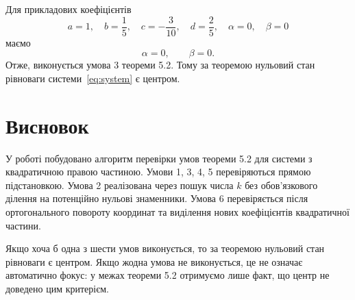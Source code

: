 \documentclass[12pt,a4paper]{article}
\begin{document}
Для прикладових коефіцієнтів
\[
a=1,\quad b=\frac15,\quad c=-\frac{3}{10},\quad d=\frac25,\quad
\alpha=0,\quad \beta=0
\]
маємо
\[
\alpha=0,\qquad \beta=0.
\]
Отже, виконується умова 3 теореми 5.2. Тому за теоремою нульовий стан рівноваги системи~\eqref{eq:system} є центром.

\section{Висновок}

У роботі побудовано алгоритм перевірки умов теореми 5.2 для системи з квадратичною правою частиною. Умови 1, 3, 4, 5 перевіряються прямою підстановкою. Умова 2 реалізована через пошук числа $k$ без обов'язкового ділення на потенційно нульові знаменники. Умова 6 перевіряється після ортогонального повороту координат та виділення нових коефіцієнтів квадратичної частини.

Якщо хоча б одна з шести умов виконується, то за теоремою нульовий стан рівноваги є центром. Якщо жодна умова не виконується, це не означає автоматично фокус: у межах теореми 5.2 отримуємо лише факт, що центр не доведено цим критерієм.
\end{document}
